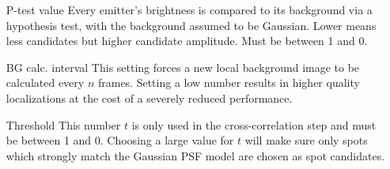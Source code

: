 \documentclass[11pt,onside]{report}
\numberwithin{equation}{chapter}
\begin{document}
\begin{itemize}[leftmargin=2cm]
\item[P-test value] Every emitter's brightness is compared to its background via a hypothesis test, with the background assumed to be Gaussian. Lower means less candidates but higher candidate amplitude. Must be between 1 and 0.
\item[BG calc. interval] This setting forces a new local background image to be calculated every $n$ frames. Setting a low number results in higher quality localizations at the cost of a severely reduced performance.
\item[Threshold] This number $t$ is only used in the cross-correlation step and must be between 1 and 0. Choosing a large value for $t$ will make sure only spots which strongly match the Gaussian PSF model are chosen as spot candidates.\\[0pt]%
\end{itemize}
\end{document}
